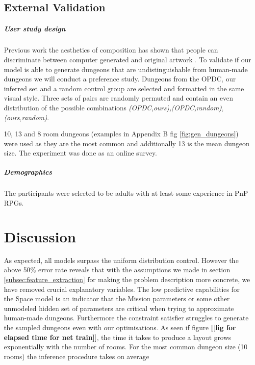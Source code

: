 \documentclass{UoYCSproject}
\begin{document}
\section{External Validation} %
\paragraph{User study design}
Previous work the aesthetics of composition has shown that people can discriminate between computer generated and original artwork \parencite{McManusMondrian} \parencite{FurnhamMondrian}. To validate if our model is able to generate dungeons that are undistinguishable from human-made dungeons we will conduct a preference study. Dungeons from the OPDC, our inferred set and a random control group are selected and formatted in the same visual style. Three sets of pairs are randomly permuted and contain an even distribution of the possible combinations \textit{(OPDC,ours),(OPDC,random),(ours,random)}.

10, 13 and 8 room dungeons (examples in Appendix B fig \ref{fig:gen_dungeons}) were used as they are the most common and additionally 13 is the mean dungeon size.
The experiment was done as an online survey.

\paragraph{Demographics}
The participants were selected to be adults with at least some experience in PnP RPGs. 


\chapter{Discussion}
As expected, all models surpass the uniform distribution control. However the above 50\% error rate reveals that with the assumptions we made in section \ref{subsec:feature_extraction} for making the problem description more concrete, we have removed crucial explanatory variables. The low predictive capabilities for the Space model is an indicator that the Mission parameters or some other unmodeled hidden set of parameters are critical when trying to approximate human-made dungeons. Furthermore the constraint satisfier struggles to generate the sampled dungeons even with our optimisations. As seen if figure \textbf{[[fig for elapsed time for net train]]}, the time it takes to produce a layout grows exponentially with the number of rooms. For the most common dungeon size (10 rooms) the inference procedure takes on average 
\end{document}
